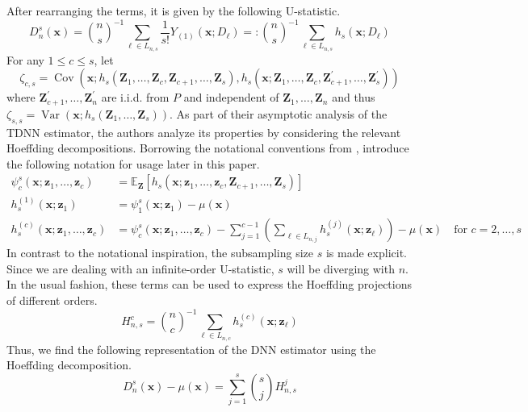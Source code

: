 \documentclass[letterpaper,10pt]{article}
\numberwithin{equation}{section}
\numberwithin{theorem}{section}
\theoremstyle{definition}
\newcommand{\1}{\mathbb{1}}
\begin{document}
After rearranging the terms, it is given by the following U-statistic.
\begin{equation}\label{U_stat}
	D_{n}^{s}(\mathbf{x})
	= \binom{n}{s}^{-1} \sum_{\ell \in L_{n,s}} \frac{1}{s!} Y_{(1)}(\mathbf{x}; D_{\ell})
	=: \binom{n}{s}^{-1} \sum_{\ell \in L_{n,s}} h_{s}(\mathbf{x}; D_{\ell})
\end{equation}
For any $1 \leq c \leq s$, let
\begin{equation}
	\zeta_{c,s}
	= \operatorname{Cov}\left(\mathbf{x}; h_s\left(\mathbf{Z}_1, \ldots, \mathbf{Z}_c, \mathbf{Z}_{c+1}, \ldots, \mathbf{Z}_s\right),
	h_s\left(\mathbf{x}; \mathbf{Z}_1, \ldots, \mathbf{Z}_c, \mathbf{Z}_{c+1}^{\prime}, \ldots, \mathbf{Z}_s^{\prime}\right)\right)
\end{equation}
where $\mathbf{Z}_{c+1}^{\prime}, \ldots, \mathbf{Z}_n^{\prime}$ are i.i.d. from $P$ and independent of $\mathbf{Z}_1, \ldots, \mathbf{Z}_n$ and thus
$\zeta_{s,s} = \operatorname{Var}\left(\mathbf{x}; h_s\left(\mathbf{Z}_1, \ldots, \mathbf{Z}_s\right)\right).$
As part of their asymptotic analysis of the TDNN estimator, the authors analyze its properties by considering the relevant Hoeffding decompositions.
Borrowing the notational conventions from \citet{lee_u-statistics_2019}, introduce the following notation for usage later in this paper.
\begin{align}
	\psi_{c}^{s}(\mathbf{x}; \mathbf{z}_{1}, \dotsc, \mathbf{z}_{c})
	 & = \mathbb{E}_{\mathbf{Z}}\left[h_{s}\left(\mathbf{x}; \mathbf{z}_{1}, \dotsc, \mathbf{z}_{c}, \mathbf{Z}_{c+1}, \dotsc, \mathbf{Z}_{s}\right)\right]                                    \\
	h_{s}^{(1)}\left(\mathbf{x}; \mathbf{z}_{1}\right)
	 & = \psi_{1}^{s}(\mathbf{x}; \mathbf{z}_{1}) - \mu(\mathbf{x})                                                                                                                            \\
	h_{s}^{(c)}\left(\mathbf{x}; \mathbf{z}_{1}, \dotsc, \mathbf{z}_{c}\right)
	 & = \psi_{c}^{s}(\mathbf{x}; \mathbf{z}_{1}, \dotsc, \mathbf{z}_{c}) - \sum_{j = 1}^{c-1}\left(\sum_{\ell \in L_{n,j}}h_{s}^{(j)}(\mathbf{x}; \mathbf{z}_{\ell})\right) - \mu(\mathbf{x})
	\quad \text{for } c = 2, \dotsc, s
\end{align}
In contrast to the notational inspiration, the subsampling size $s$ is made explicit.
Since we are dealing with an infinite-order U-statistic, $s$ will be diverging with $n$.
In the usual fashion, these terms can be used to express the Hoeffding projections of different orders.
\begin{equation}
	H_{n,s}^{c}
	= \binom{n}{c}^{-1} \sum_{\ell \in L_{n,c}} h^{(c)}_{s}(\mathbf{x}; \mathbf{z}_{\ell})
\end{equation}
Thus, we find the following representation of the DNN estimator using the Hoeffding decomposition.
\begin{equation}
	D_n^s\left(\mathbf{x}\right) - \mu(\mathbf{x})
	= \sum_{j = 1}^{s}\binom{s}{j}H_{n,s}^{j}
\end{equation}
\end{document}
